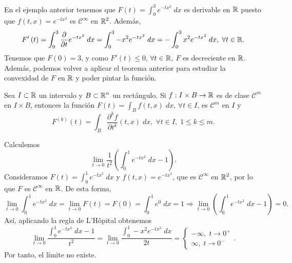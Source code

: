 \begin{eg}
En el ejemplo anterior tenemos que $\displaystyle F\left(t\right)=\int^{3}_{0} e^{-tx^{2}} \; dx $ es derivable en $\displaystyle \mathbb{R} $ puesto que $\displaystyle f\left(t,x\right)=e^{-tx^{2}} $ es $\displaystyle \mathcal{C}^{\infty} $ en $\displaystyle \mathbb{R}^{2} $. Además, 
\[F'\left(t\right)=\int^{3}_{0} \frac{\partial }{\partial t}e^{-tx^{2}} \; dx = \int^{3}_{0} -x^{2}e^{-tx^{2}} \; dx =-\int^{3}_{0} x^{2}e^{-tx^{2}} \; dx, \; \forall t \in \mathbb{R} .\]
Tenemos que $\displaystyle F\left(0\right)=3 $, y como $\displaystyle F'\left(t\right)\leq 0 $, $\displaystyle \forall t\in \mathbb{R} $, $\displaystyle F $ es decreciente en $\displaystyle \mathbb{R} $. Además, podemos volver a aplicar el teorema anterior para estudiar la convexidad de $\displaystyle F $ en $\displaystyle \mathbb{R} $ y poder pintar la función.
\end{eg}
\begin{colorary}
Sea $\displaystyle I \subset \mathbb{R} $ un intervalo y $\displaystyle B \subset \mathbb{R}^{n} $ un rectángulo. Si $\displaystyle f : I \times B \to \mathbb{R} $ es de clase $\displaystyle \mathcal{C}^{m} $ en $\displaystyle I \times B $, entonces la función $\displaystyle F\left(t\right)=\int _{B}f\left(t,x\right) \; dx $, $\displaystyle \forall t \in I $, es $\displaystyle \mathcal{C}^{m} $ en $\displaystyle I $ y
\[F^{\left(k\right)}\left(t\right)=\int _{B}\frac{\partial ^{k}f}{\partial t ^{k}}\left(t,x\right) \; dx, \; \forall t \in I, \; 1 \leq k \leq m .\]
\end{colorary}
\begin{eg}
Calculemos
\[\lim_{t \to 0}\frac{1}{t ^{2}}\left(\int^{1}_{0} e^{-tx^{2}} \; dx -1\right) .\]
Consideramos $\displaystyle F\left(t\right)=\int^{1}_{0} e^{-tx^{2}} \; dx $ y $\displaystyle f\left(t,x\right)=e^{-tx^{2}} $, que es $\displaystyle \mathcal{C}^{\infty} $ en $\displaystyle \mathbb{R}^{2} $, por lo que $\displaystyle F $ es $\displaystyle \mathcal{C}^{\infty} $ en $\displaystyle \mathbb{R} $. De esta forma,
\[\lim_{t \to 0}\int^{1}_{0} e^{-tx^{2}} \; dx = \lim_{t \to 0}F\left(t\right)=F\left(0\right)=\int^{1}_{0} e^{0} \; dx = 1 \Rightarrow \lim_{t \to 0}\left(\int^{1}_{0} e^{-tx^{2}} \; dx-1\right)=0 .\]
Así, aplicando la regla de L'Hôpital obtenemos
\[\lim_{t \to 0}\frac{\int^{1}_{0} e^{-tx^{2}} \; dx-1}{t ^{2}}=\lim_{t \to 0}\frac{\int^{1}_{0} -x^{2}e^{-tx^{2}} \; dx}{2t}
=
\begin{cases}
-\infty, \; t \to 0^{+} \\
\infty, \; t \to 0^{-}
\end{cases}
.\]
Por tanto, el límite no existe. 
\end{eg}
